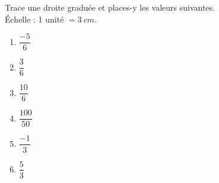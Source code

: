 \documentclass[../../syllabus_2.tex]{subfiles}
\begin{document}
\begin{exercise}
  Trace une droite graduée et places-y les valeurs suivantes.\\
  Échelle : 1 unité $=\SI{3}{cm}$.
  \begin{enumerate}[cols=6]
    \item  $\dfrac{- 5}{6}$
    \item  $\dfrac{3}{6}$
    \item  $\dfrac{10}{6}$
    \item  $\dfrac{100}{50}$
    \item  $\dfrac{- 1}{3}$
    \item  $\dfrac{5}{3}$
  \end{enumerate}
\end{exercise}
\end{document}
